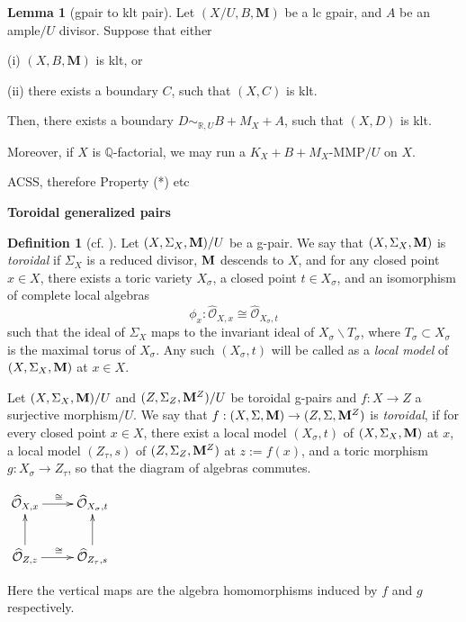 \documentclass[11pt]{amsart}
\numberwithin{equation}{section}
\newcommand{\Mm}{{\bf{M}}}
\theoremstyle{definition}
\newtheorem{defn}[thm]{Definition}
\theoremstyle{definition}
\newtheorem{lemma}[theorem]{Lemma}
\theoremstyle{definition}
\begin{document}
\begin{lemma}[gpair to klt pair]\label{lem: klt boundary}
	Let $(X/U,B,\mathbf{M})$ be a lc gpair, and $A$ be an ample$/U$ divisor. Suppose that either 
	
	(i) $(X, B,\mathbf{M})$ is klt, or
	
	(ii) there exists a boundary $C$, such that $(X,C)$ is klt.
	
  Then, there exists a boundary $D \sim_{\mathbb{R},U} B+M_{X}+A$, such that $(X,D)$ is klt. 
	
	Moreover, if $X$ is $\mathbb{Q}$-factorial, we may run a $K_X+B+M_{X}$-MMP$/U$ on $X$.
\end{lemma}


ACSS, therefore  Property (*)  etc

\textbf{Toroidal generalized pairs}

\begin{defn}[{cf. \cite[Definition 2.1]{ACSS21}}]\label{defn: toroidal g-pairs}
Let $(X,\Sigma_X,\Mm)/U$ be a g-pair. We say that $(X,\Sigma_X,\Mm)$ is \emph{toroidal} if $\Sigma_X$ is a reduced divisor, $\Mm$ descends to $X$, and for any closed point $x\in X$, there exists a toric variety $X_{\sigma}$, a closed point $t\in X_{\sigma}$, and an isomorphism of complete local algebras 
$$\phi_x:\widehat{\mathcal{O}}_{X,x}\cong\widehat{\mathcal{O}}_{X_\sigma,t}$$
such that the ideal of $\Sigma_X$ maps to the invariant ideal of $X_{\sigma}\backslash T_{\sigma}$, where $T_\sigma\subset X_\sigma$ is the maximal torus of $X_{\sigma}$. Any such $(X_\sigma, t)$ will be called as a \emph{local model} of $(X,\Sigma_X,\Mm)$ at $x\in X$.

Let $(X,\Sigma_X,\Mm)/U$ and $(Z,\Sigma_Z,\Mm^Z)/U$ be toroidal g-pairs and $f: X\rightarrow Z$ a surjective morphism$/U$. We say that $f: (X,\Sigma,\Mm)\rightarrow (Z,\Sigma,\Mm^Z)$ is \emph{toroidal}, if for every closed point $x\in X$, there exist a local model $(X_\sigma,t)$ of $(X,\Sigma_X,\Mm)$ at $x$, a local model $(Z_{\tau},s)$ of $(Z,\Sigma_Z,\Mm^Z)$ at $z:=f(x)$, and a toric morphism $g: X_\sigma\to Z_{\tau}$, so that the diagram of algebras commutes.
\begin{center}$\xymatrix{
    \widehat{\mathcal{O}}_{X,x}\ar@{->}[r]^{\cong}  &     \widehat{\mathcal{O}}_{X_{\sigma},t} \\
     \widehat{\mathcal{O}}_{Z,z}\ar@{->}[r]^{\cong}\ar@{->}[u] & \widehat{\mathcal{O}}_{Z_{\tau},s}\ar@{->}[u]
}$
\end{center}
Here the vertical maps are the algebra homomorphisms induced by $f$ and $g$ respectively. 
\end{defn}
\end{document}
